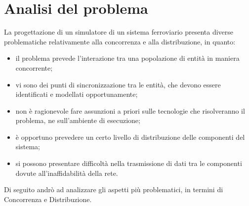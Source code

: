 \chapter{Analisi del problema}

La progettazione di un simulatore di un sistema ferroviario presenta diverse problematiche relativamente alla concorrenza e alla distribuzione, in quanto:
\begin{itemize}
	\item il problema prevede l'interazione tra una popolazione di entità in maniera concorrente;
	\item vi sono dei punti di sincronizzazione tra le entità, che devono essere identificati e modellati opportunamente;
	\item non è ragionevole fare assunzioni a priori sulle tecnologie che risolveranno il problema, ne sull'ambiente di esecuzione;
	\item è opportuno prevedere un certo livello di distribuzione delle componenti del sistema;
	\item si possono presentare difficoltà nella trasmissione di dati tra le componenti dovute all'inaffidabilità della rete.
\end{itemize} 
Di seguito andrò ad analizzare gli aspetti più problematici, in termini di Concorrenza e Distribuzione.



